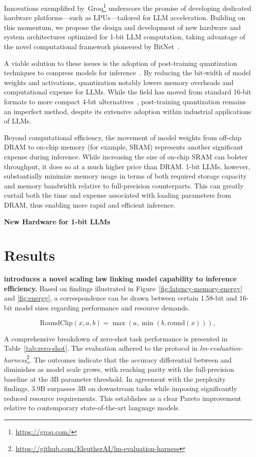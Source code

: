 Innovations exemplified by~Groq\footnote{\url{https://groq.com/}} underscore the promise of developing dedicated hardware platforms—such as LPUs—tailored for LLM acceleration. Building on this momentum, we propose the design and development of new hardware and system architectures optimized for 1-bit LLM computation, taking advantage of the novel computational framework pioneered by BitNet~\cite{bitnet}.

A viable solution to these issues is the adoption of post-training quantization techniques to compress models for inference~\cite{smoothquant, gptq, quip, quip_sharp}. By reducing the bit-width of model weights and activations, quantization notably lowers memory overheads and computational expense for LLMs. While the field has moved from standard 16-bit formats to more compact 4-bit alternatives~\cite{gptq, awq}, post-training quantization remains an imperfect method, despite its extensive adoption within industrial applications of LLMs.

Beyond computational efficiency, the movement of model weights from off-chip DRAM to on-chip memory (for example, SRAM) represents another significant expense during inference. While increasing the size of on-chip SRAM can bolster throughput, it does so at a much higher price than DRAM. 1-bit LLMs, however, substantially minimize memory usage in terms of both required storage capacity and memory bandwidth relative to full-precision counterparts. This can greatly curtail both the time and expense associated with loading parameters from DRAM, thus enabling more rapid and efficient inference.

\textbf{New Hardware for 1-bit LLMs}

\section{Results}

\textbf{ introduces a novel scaling law linking model capability to inference efficiency.} Based on findings illustrated in Figure~\ref{fig:latency-memory-energy} and \ref{fig:energy}, a correspondence can be drawn between certain 1.58-bit and 16-bit model sizes regarding performance and resource demands.

\begin{equation}
    \mathrm{RoundClip}(x, a, b) = \max(a, \min(b, \mathrm{round}(x))),
\end{equation}

A comprehensive breakdown of zero-shot task performance is presented in Table~\ref{tab:zero-shot}. The evaluation adhered to the protocol in \emph{lm-evaluation-harness}\footnote{\url{https://github.com/EleutherAI/lm-evaluation-harness}}. The outcomes indicate that the accuracy differential between  and  diminishes as model scale grows, with  reaching parity with the full-precision baseline at the 3B parameter threshold. In agreement with the perplexity findings,  3.9B surpasses  3B on downstream tasks while imposing significantly reduced resource requirements. This establishes  as a clear Pareto improvement relative to contemporary state-of-the-art language models.

